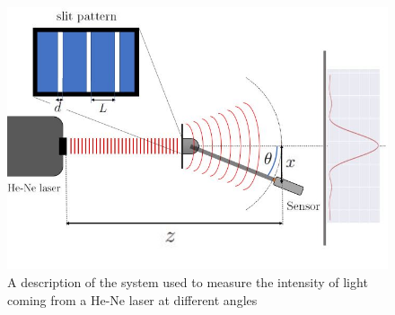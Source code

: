 \begin{figure}[H]
    \includegraphics[width=0.9\columnwidth]{figures/Apparatus.JPG}
    \caption{A description of the system used to measure the intensity of light coming from a He-Ne laser at different angles}
    \label{fig:Apparatus}
\end{figure}